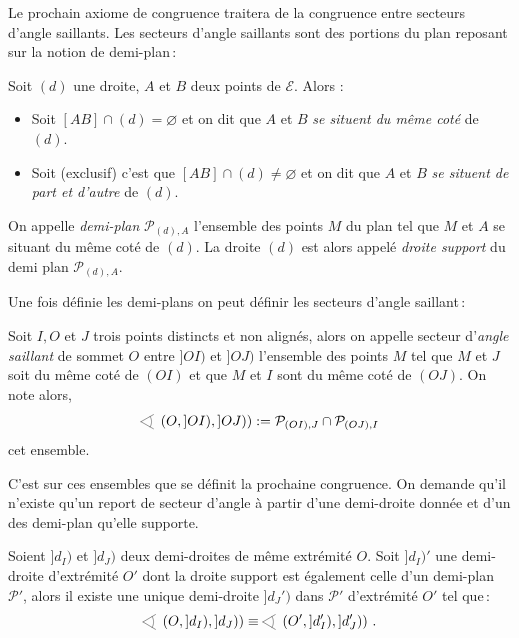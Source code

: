 Le prochain axiome de congruence traitera de la congruence entre secteurs d'angle saillants. Les secteurs d'angle saillants sont des portions du plan reposant sur la notion de demi-plan\,: 
\begin{defi}\label{def-demiplan}
Soit $(d)$ une droite, $A$ et $B$ deux points de $\mathcal{E}$. Alors :
\begin{itemize}[$\bullet$]
    \item Soit $[AB]\cap (d) = \varnothing$ et on dit que $A$ et $B$ \emph{se situent du même coté} de $(d)$.
    \item Soit (exclusif) c'est que $[AB]\cap (d) \neq \varnothing$ et on dit que $A$ et $B$ \emph{se situent de part et d'autre} de $(d)$.
\end{itemize}
On appelle \emph{demi-plan} $\mathcal{P}_{(d),A}$ l'ensemble des points $M$ du plan tel que $M$ et $A$ se situant du même coté de $(d)$. La droite $(d)$ est alors appelé \emph{droite support} du demi plan $\mathcal{P}_{(d),A}$.
\end{defi}
Une fois définie les demi-plans on peut définir les secteurs d'angle saillant\,: 
\begin{defi}\label{defi-anglesaillant}
    Soit $I, O$ et $J$ trois points distincts et non alignés, alors on appelle secteur d'\emph{angle saillant} de sommet $O$ entre $]OI)$ et $]OJ)$ l'ensemble des points $M$ tel que $M$ et $J$ soit du même coté de $(OI)$ et que $M$ et $I$ sont du même coté de $(OJ)$. On note alors,
    \begin{equation*}
        \anglesaillant\left({O},{]OI)},{]OJ)}\right) := \mathcal{P}_{(OI),J} \cap \mathcal{P}_{(OJ),I}  
    \end{equation*}
    cet ensemble. %
\end{defi}
C'est sur ces ensembles que se définit la prochaine congruence. On demande qu'il n'existe qu'un report de secteur d'angle à partir d'une demi-droite donnée et d'un des demi-plan qu'elle supporte. 
\begin{axi}\label{axi-C4}
    Soient $]d_I)$ et $]d_J)$ deux demi-droites de même extrémité $O$. Soit $]d_I)'$ une demi-droite d'extrémité $O'$ dont la droite support est également celle d'un demi-plan $\mathcal{P}'$, alors il existe une unique demi-droite $]d_J')$ dans $\mathcal{P}'$ d'extrémité $O'$ tel que\,:
    $$\anglesaillant\left(O,]d_I),]d_J)\right)\equiv\anglesaillant\left(O',]d_I'),]d_J')\right)\,.$$
\end{axi}
